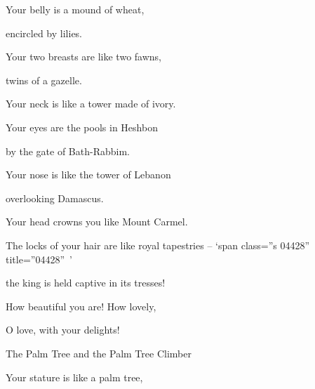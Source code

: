 {\par }{\Q Your belly
is a mound
of wheat,
\par }{\Q encircled
by lilies.
\par }{\Q {}Your two
breasts
are like two
fawns,
\par }{\Q twins
of a gazelle.
\par }{\Q {}Your neck
is like a tower
made of ivory.
\par }{\Q Your eyes
are the pools
in
Heshbon
\par }{\Q by the gate
of Bath-Rabbim.
\par }{\Q Your nose
is like the tower
of Lebanon
\par }{\Q overlooking
Damascus.
\par }{\Q {}Your head
crowns you like Mount Carmel.
\par }{\Q The locks
of your hair
are like royal tapestries – ‘span class=”s 04428” title=”04428” ’
\par }{\Q the king
is held captive
in its tresses!
\par }{\PP \par }{\Q {}How
beautiful
you are! How
lovely,
\par }{\Q O love,
with your delights!
\par }{\SH The Palm Tree and the Palm Tree Climber
\par }{\SH 
{}
\par }{\Q {}Your stature
is like a palm
tree,

}
